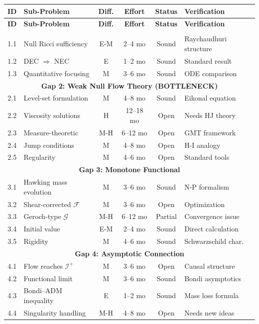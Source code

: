 \begin{center}
\small
\begin{longtable}{|c|l|c|c|c|l|}
\hline
\textbf{ID} & \textbf{Sub-Problem} & \textbf{Diff.} & \textbf{Effort} & \textbf{Status} & \textbf{Verification} \\
\hline
\endfirsthead
\hline
\textbf{ID} & \textbf{Sub-Problem} & \textbf{Diff.} & \textbf{Effort} & \textbf{Status} & \textbf{Verification} \\
\hline
\endhead
\hline
\endfoot
\multicolumn{6}{|c|}{\textbf{Gap 1: Energy Conditions}} \\
\hline
1.1 & Null Ricci sufficiency & E-M & 2--4 mo & Sound & Raychaudhuri structure \\
1.2 & DEC $\Rightarrow$ NEC & E & 1--2 mo & Sound & Standard result \\
1.3 & Quantitative focusing & M & 3--6 mo & Sound & ODE comparison \\
\hline
\multicolumn{6}{|c|}{\textbf{Gap 2: Weak Null Flow Theory (BOTTLENECK)}} \\
\hline
2.1 & Level-set formulation & M & 4--8 mo & Sound & Eikonal equation \\
2.2 & Viscosity solutions & H & 12--18 mo & Open & Needs HJ theory \\
2.3 & Measure-theoretic & M-H & 6--12 mo & Open & GMT framework \\
2.4 & Jump conditions & M & 4--8 mo & Open & H-I analogy \\
2.5 & Regularity & M & 4--6 mo & Open & Standard tools \\
\hline
\multicolumn{6}{|c|}{\textbf{Gap 3: Monotone Functional}} \\
\hline
3.1 & Hawking mass evolution & M & 3--6 mo & Sound & N-P formalism \\
3.2 & Shear-corrected $\mathcal{F}$ & M & 3--6 mo & Open & Optimization \\
3.3 & Geroch-type $\mathcal{G}$ & M-H & 6--12 mo & Partial & Convergence issue \\
3.4 & Initial value & E-M & 2--4 mo & Sound & Direct calculation \\
3.5 & Rigidity & M & 4--6 mo & Sound & Schwarzschild char. \\
\hline
\multicolumn{6}{|c|}{\textbf{Gap 4: Asymptotic Connection}} \\
\hline
4.1 & Flow reaches $\mathscr{I}^+$ & M & 3--6 mo & Open & Causal structure \\
4.2 & Functional limit & M & 3--6 mo & Sound & Bondi asymptotics \\
4.3 & Bondi--ADM inequality & E & 1--2 mo & Sound & Mass loss formula \\
4.4 & Singularity handling & M-H & 4--8 mo & Open & Needs new ideas \\
\hline
\end{longtable}
\end{center}

